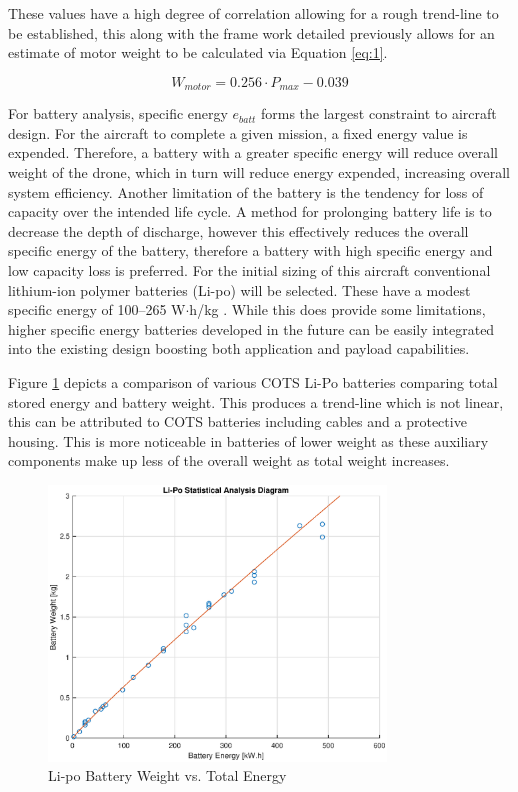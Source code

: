 These values have a high degree of correlation allowing for a rough trend-line to be established, this along with the frame work detailed previously allows for an estimate of motor weight to be calculated via Equation \ref{eq:1}. 

\begin{equation}
    W_{motor} = 0.256\cdot P_{max} - 0.039
    \label{eq:1}
\end{equation}


For battery analysis, specific energy $e_{batt}$ forms the largest constraint to aircraft design. For the aircraft to complete a given mission, a fixed energy value is expended. Therefore, a battery with a greater specific energy will reduce overall weight of the drone, which in turn will reduce energy expended, increasing overall system efficiency. Another limitation of the battery is the tendency for loss of capacity over the intended life cycle. A method for prolonging battery life is to decrease the depth of discharge, however this effectively reduces the overall specific energy of the battery, therefore a battery with high specific energy and low capacity loss is preferred. For the initial sizing of this aircraft conventional lithium-ion polymer batteries (Li-po) will be selected. These have a modest specific energy of 100–265 W$\cdot$h/kg \cite{elec2010}. While this does provide some limitations, higher specific energy batteries developed in the future can be easily integrated into the existing design boosting both application and payload capabilities.  

\vspace{1cm}

Figure \ref{fig:statbatt} depicts a comparison of various COTS Li-Po batteries comparing total stored energy and battery weight. This produces a trend-line which is not linear, this can be attributed to COTS batteries including cables and a protective housing. This is more noticeable in batteries of lower weight as these auxiliary components make up less of the overall weight as total weight increases.
\begin{figure}[H]
    \centering
    \includegraphics[width = 0.8\textwidth]{PrelimSizing/lipo.eps}
    \caption{Li-po Battery Weight vs. Total Energy}
    \label{fig:statbatt}
\end{figure}

